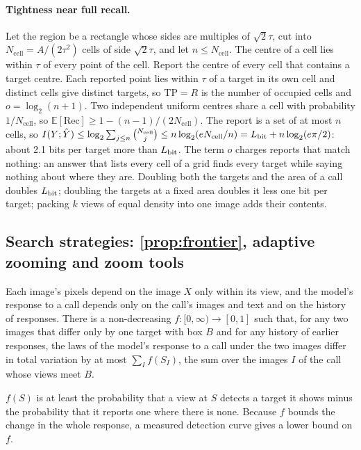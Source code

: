 \paragraph{Tightness near full recall.} Let the region be a rectangle whose sides are multiples of $\sqrt2\tau$, cut into $N_{\mathrm{cell}} = A/(2\tau^2)$ cells of side $\sqrt2\tau$, and let $n \le N_{\mathrm{cell}}$. The centre of a cell lies within $\tau$ of every point of the cell. Report the centre of every cell that contains a target centre. Each reported point lies within $\tau$ of a target in its own cell and distinct cells give distinct targets, so $\mathrm{TP} = R$ is the number of occupied cells and $o = \log_2(n+1)$. Two independent uniform centres share a cell with probability $1/N_{\mathrm{cell}}$, so $\mathbb{E}[\mathrm{Rec}] \ge 1 - (n-1)/(2N_{\mathrm{cell}})$. The report is a set of at most $n$ cells, so $I(Y; \hat Y) \le \log_2 \sum_{j \le n} \binom{N_{\mathrm{cell}}}{j} \le n\log_2(eN_{\mathrm{cell}}/n) = L_{\mathrm{bit}} + n\log_2(e\pi/2)$: about 2.1 bits per target more than $L_{\mathrm{bit}}$. The term $o$ charges reports that match nothing: an answer that lists every cell of a grid finds every target while saying nothing about where they are. Doubling both the targets and the area of a call doubles $L_{\mathrm{bit}}$; doubling the targets at a fixed area doubles it less one bit per target; packing $k$ views of equal density into one image adds their contents.

\subsection{Search strategies: \cref{prop:frontier}, adaptive zooming and zoom tools}
\label{sec:proofs-search}

\begin{assumption}
\label{ass:graded}
Each image's pixels depend on the image $X$ only within its view, and the model's response to a call depends only on the call's images and text and on the history of responses. There is a non-decreasing $f: [0,\infty) \to [0,1]$ such that, for any two images that differ only by one target with box $B$ and for any history of earlier responses, the laws of the model's response to a call under the two images differ in total variation by at most $\sum_I f(S_I)$, the sum over the images $I$ of the call whose views meet $B$.
\end{assumption}

$f(S)$ is at least the probability that a view at $S$ detects a target it shows minus the probability that it reports one where there is none. Because $f$ bounds the change in the whole response, a measured detection curve gives a lower bound on $f$.

